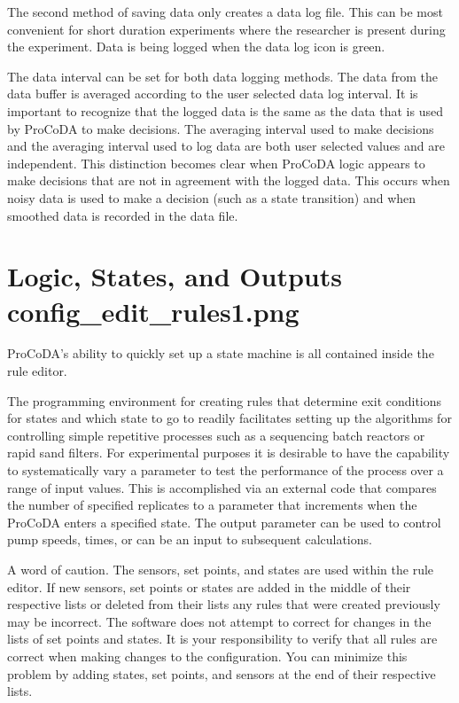 \documentclass[letterpaper,10pt,english]{sphinxmanual}
\begin{document}
The second method of saving data only creates a data log file. This can be most convenient for short duration experiments where the researcher is present during the experiment. Data is being logged when the data log icon is green. 

The data interval can be set for both data logging methods. The data from the data buffer is averaged according to the user selected data log interval. It is important to recognize that the logged data is  the same as the data that is used by ProCoDA to make decisions. The averaging interval used to make decisions and the averaging interval used to log data are both user selected values and are independent. This distinction becomes clear when ProCoDA logic appears to make decisions that are not in agreement with the logged data. This occurs when noisy data is used to make a decision (such as a state transition) and when smoothed data is recorded in the data file.


\section[Logic, States, and Outputs]{Logic, States, and Outputs \lowercase{\sphinxincludegraphics}{{config_edit_rules1}.png}}
\label{\detokenize{ProCoDA/ProCoDA:logic-states-and-outputs-config-edit-rules}}\label{\detokenize{ProCoDA/ProCoDA:heading-procoda-logic}}
ProCoDA’s ability to quickly set up a state machine is all contained inside the rule editor.

The programming environment for creating rules that determine exit conditions for states and which state to go to readily facilitates setting up the algorithms for controlling simple repetitive processes such as a sequencing batch reactors or rapid sand filters. For experimental purposes it is desirable to have the capability to systematically vary a parameter to test the performance of the process over a range of input values. This is accomplished via an external code that compares the number of specified replicates to a parameter that increments when the ProCoDA enters a specified state. The output parameter can be used to control pump speeds, times, or can be an input to subsequent calculations.

A word of caution. The sensors, set points, and states are used within the rule editor. If new sensors, set points or states are added in the middle of their respective lists or deleted from their lists any rules that were created previously may be incorrect. The software does not attempt to correct for changes in the lists of set points and states. It is your responsibility to verify that all rules are correct when making changes to the configuration. You can minimize this problem by adding states, set points, and sensors at the end of their respective lists.
\end{document}
